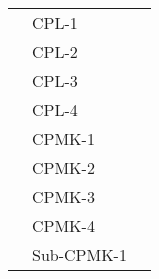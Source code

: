 \documentclass[12pt, landscape]{simrep} %
\begin{document}
\begin{longtable}{*{8}{P{1.15in}}@{}}
                                          & CPL-1                                                        &                                                                                                         \\

                                           & CPL-2                                                        &                                                                                                         \\
	                                           & CPL-3                                                        &                                                                                                         \\
	                                           & CPL-4                                                        &                                                                                                         \\
                                          \midrule

	                                           & CPMK-1                                                       &                                                                                                        \\

	                                           & CPMK-2                                                       &                                                                                                        \\
	                                           & CPMK-3                                                       &                                                                                                        \\
	                                           & CPMK-4                                                       &                                                                                                        \\
                                               \midrule

	                                           & Sub-CPMK-1                                                   &                                                                                                       \\


\end{longtable}
\end{document}
